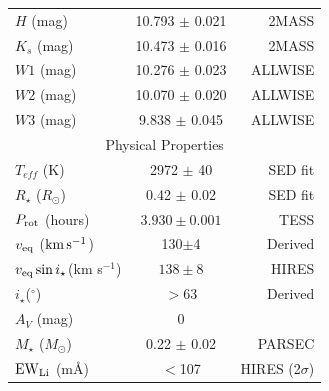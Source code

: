 \documentclass{nature3}
\newcommand{\kms}{\ensuremath{\rm km\,s^{-1}}}
\begin{document}
\begin{methods}
\begin{table}
\begin{tabular}{lcr}
    $H$ (mag)                       & 10.793 $\pm$ 0.021 & 2MASS     \\
    $K_s$ (mag)                     & 10.473 $\pm$ 0.016 & 2MASS     \\
    $W1$ (mag)                      & 10.276 $\pm$ 0.023 & ALLWISE   \\ %
    $W2$ (mag)                      & 10.070 $\pm$ 0.020 & ALLWISE   \\
    $W3$ (mag)                      &  9.838 $\pm$ 0.045 & ALLWISE   \\
    \hline
    \multicolumn{3}{c}{Physical Properties} \\
    \hline
    $T_{eff}$ (K) & 2972 $\pm$ 40 & \cite{Bouma2024} SED fit\\
    $R_\star$ ($R_{\odot}$) & 0.42 $\pm$ 0.02 & \cite{Bouma2024} SED fit \\
    $P_{\rm rot}$ (hours) & $3.930\pm 0.001$ & TESS \\ 
    $v_{\rm eq}$ (\kms)  &  130$\pm$4  & Derived \\
    $v_{\rm eq} \sin i_\star$(km s$^{-1}$) & $138 \pm 8$ & HIRES \\
    $i_\star$($^\circ$) & $>$63 & Derived \\
    $A_V$ (mag) & 0 & \cite{Green2019} \\
    $M_\star$ ($M_{\odot}$)  & 0.22 $\pm$ 0.02  & PARSEC \cite{Chen2014}\\
    ${\rm EW}_{\rm Li}$ (m\AA) & $<$107 & HIRES (2$\sigma$)\\

\end{tabular}
\end{table}
\end{methods}
\end{document}
